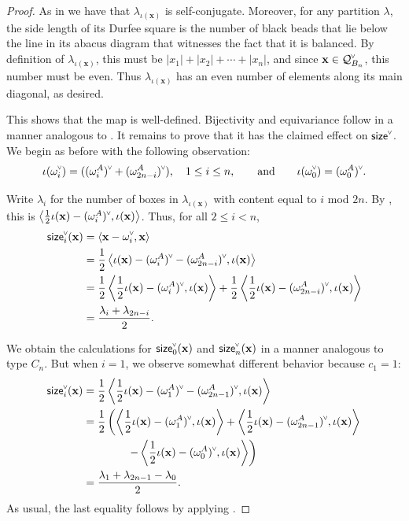 \documentclass[ALCO,published]{cedram}
\newcommand{\chk}[1]{#1^{\normalfont\smash{\scalebox{.5}[.5]{\rotatebox{90}{\textbf{\textless}}}}}}
\newcommand{\Q}{\mathcal{Q}}
\newcommand{\size}{{\sf size}}
\begin{document}
\begin{proof}
As in  we have that $\lambda_{\iota(\mathbf{x})}$ is self-conjugate. Moreover, for any partition $\lambda$, the side length of its Durfee square is the number of black beads that lie below the line in its abacus diagram that witnesses the fact that it is balanced. By definition of $\lambda_{\iota(\mathbf{x})}$, this must be $|x_1|+|x_2|+\cdots+|x_n|$, and since $\mathbf{x}\in \chk{\Q}_{B_n}$, this number must be even. Thus $\lambda_{\iota(\mathbf{x})}$ has an even number of elements along its main diagonal, as desired.

This shows that the map is well-defined. Bijectivity and equivariance follow in a manner analogous to . It remains to prove that it has the claimed effect on $\chk{\size}$. We begin as before with the following observation:
\[
\iota(\chk{\omega_i}) = (\chk{(\omega_i^A)}+\chk{(\omega_{2n-i}^A)}),
\quad 1\leq i\leq n,
\qquad\text{and}\qquad
\iota(\chk{\omega_0}) = \chk{(\omega_0^A)}.
\]

Write $\lambda_i$ for the number of boxes in $\lambda_{\iota(\mathbf{x})}$ with content equal to $i$ mod $2n$. By , this is $\left\langle\frac{1}{2}\iota(\mathbf{x})-\chk{(\omega_i^A)}, \iota(\mathbf{x})\right\rangle$. Thus,
for all $2\leq i<n$,
\begin{align*}
\chk{\size}_i(\mathbf{x}) 
&= \left\langle \mathbf{x}- \chk{\omega_i}, \mathbf{x} \right\rangle \\
&= \frac{1}{2}\left\langle \iota(\mathbf{x}) - \chk{(\omega_i^A)}-\chk{(\omega_{2n-i}^A)}, \iota(\mathbf{x}) \right\rangle \\
&= \frac{1}{2}\left\langle \frac{1}{2}\iota(\mathbf{x}) - \chk{(\omega_i^A)}, \iota(\mathbf{x}) \right\rangle + \frac{1}{2}\left\langle \frac{1}{2}\iota(\mathbf{x}) - \chk{(\omega_{2n-i}^A)}, \iota(\mathbf{x}) \right\rangle \\
&= \frac{\lambda_i + \lambda_{2n-i}}{2}.
\end{align*}

We obtain the calculations for $\chk{\size}_0(\mathbf{x})$ and $\chk{\size}_n(\mathbf{x})$ in a manner analogous to type $C_n$. But when $i=1$, we observe somewhat different behavior because $c_1=1$:
\begin{align*}
\chk{\size}_i(\mathbf{x})
&= \frac{1}{2}\left\langle \frac{1}{2}\iota(\mathbf{x}) - \chk{(\omega_1^A)}-\chk{(\omega_{2n-1}^A)}, \iota(\mathbf{x}) \right\rangle \\
&= \frac{1}{2}\left(\left\langle \frac{1}{2}\iota(\mathbf{x}) - \chk{(\omega_1^A)}, \iota(\mathbf{x}) \right\rangle + \left\langle \frac{1}{2}\iota(\mathbf{x}) - \chk{(\omega_{2n-1}^A)}, \iota(\mathbf{x}) \right\rangle \right. \\
& \qquad\qquad \left. - \left\langle \frac{1}{2}\iota(\mathbf{x}) - \chk{(\omega_0^A)}, \iota(\mathbf{x}) \right\rangle \right) \\
&= \frac{\lambda_1 + \lambda_{2n-1}-\lambda_0}{2}.
\end{align*}
As usual, the last equality follows by applying .


\end{proof}
\end{document}
